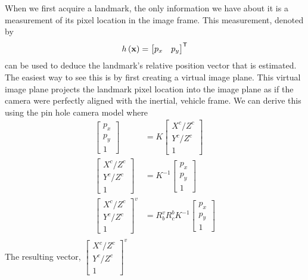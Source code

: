 When we first acquire a landmark, the only information we have about it is a
measurement of its pixel location in the image frame. This measurement, denoted
by
\begin{equation}
  h \left( \boldsymbol{\mathrm{x}} \right) = 
  \begin{bmatrix}
    p_x & p_y
  \end{bmatrix}^{\mathsf{T}}
\end{equation}
can be used to deduce the landmark's relative position vector that is estimated.
The easiest way to see this is by first creating a virtual image plane. This
virtual image plane projects the landmark pixel location into the image plane as
if the camera were perfectly aligned with the inertial, vehicle frame. We can
derive this using the pin hole camera model where
\begin{align}
  \begin{bmatrix}
    p_x \\ p_y \\ 1
  \end{bmatrix} &= K
  \begin{bmatrix}
    X^c / Z^c \\
    Y^c / Z^c \\
    1
  \end{bmatrix} \\
  \begin{bmatrix}
    X^c / Z^c \\
    Y^c / Z^c \\
    1
  \end{bmatrix}
   &= K^{-1}
  \begin{bmatrix}
    p_x \\ p_y \\ 1
  \end{bmatrix} \\
  \begin{bmatrix}
    X^c / Z^c \\
    Y^c / Z^c \\
    1
  \end{bmatrix}^v
   &= R_b^v R_c^b K^{-1}
  \begin{bmatrix}
    p_x \\ p_y \\ 1
  \end{bmatrix} \\
\end{align}
The resulting vector, $
  \begin{bmatrix}
    X^c / Z^c \\
    Y^c / Z^c \\
    1
  \end{bmatrix}^v$
